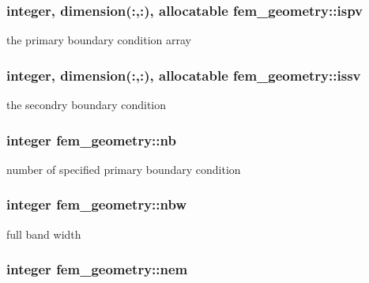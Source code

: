 \subsubsection[{ispv}]{\setlength{\rightskip}{0pt plus 5cm}integer, dimension(\+:,\+:), allocatable fem\+\_\+geometry\+::ispv}\label{classfem__geometry_af6fe274e6f297c581b171d1b2e03372c}


the primary boundary condition array 

\hypertarget{classfem__geometry_a43cd6cae2958cc6df56cf3eae9128075}{}
\subsubsection[{issv}]{\setlength{\rightskip}{0pt plus 5cm}integer, dimension(\+:,\+:), allocatable fem\+\_\+geometry\+::issv}\label{classfem__geometry_a43cd6cae2958cc6df56cf3eae9128075}


the secondry boundary condition 

\hypertarget{classfem__geometry_aa893111b8f89f4acf9d5a72a2fd4b654}{}
\subsubsection[{nb}]{\setlength{\rightskip}{0pt plus 5cm}integer fem\+\_\+geometry\+::nb}\label{classfem__geometry_aa893111b8f89f4acf9d5a72a2fd4b654}


number of specified primary boundary condition 

\hypertarget{classfem__geometry_a7015292b75c4849ffe1c158263c47dd9}{}
\subsubsection[{nbw}]{\setlength{\rightskip}{0pt plus 5cm}integer fem\+\_\+geometry\+::nbw}\label{classfem__geometry_a7015292b75c4849ffe1c158263c47dd9}


full band width 

\hypertarget{classfem__geometry_a25c1889eff70cf93eadef0a100d29bd1}{}
\subsubsection[{nem}]{\setlength{\rightskip}{0pt plus 5cm}integer fem\+\_\+geometry\+::nem}\label{classfem__geometry_a25c1889eff70cf93eadef0a100d29bd1}


